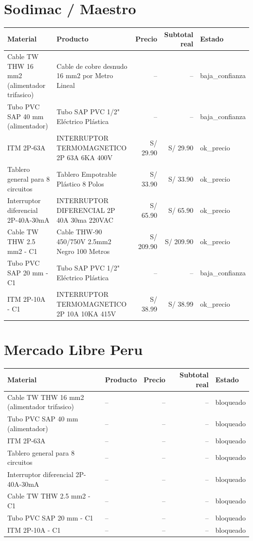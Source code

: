 \documentclass[11pt,a4paper]{article}
\begin{document}
\section{Sodimac / Maestro}
\begin{longtable}{p{} p{} r r p{}}
\toprule Material & Producto & Precio & Subtotal real & Estado \\ \midrule\endhead
Cable TW THW 16 mm2 (alimentador trifasico) & Cable de cobre desnudo 16 mm2 por Metro Lineal & -- & -- & baja\_confianza \\
Tubo PVC SAP 40 mm (alimentador) & Tubo SAP PVC 1/2" Eléctrico Plástica & -- & -- & baja\_confianza \\
ITM 2P-63A & INTERRUPTOR TERMOMAGNETICO 2P 63A 6KA 400V & S/ 29.90 & S/ 29.90 & ok\_precio \\
Tablero general para 8 circuitos & Tablero Empotrable Plástico 8 Polos & S/ 33.90 & S/ 33.90 & ok\_precio \\
Interruptor diferencial 2P-40A-30mA & INTERRUPTOR DIFERENCIAL 2P 40A 30ma 220VAC & S/ 65.90 & S/ 65.90 & ok\_precio \\
Cable TW THW 2.5 mm2 - C1 & Cable THW-90 450/750V 2.5mm2 Negro 100 Metros & S/ 209.90 & S/ 209.90 & ok\_precio \\
Tubo PVC SAP 20 mm - C1 & Tubo SAP PVC 1/2" Eléctrico Plástica & -- & -- & baja\_confianza \\
ITM 2P-10A - C1 & INTERRUPTOR TERMOMAGNETICO 2P 10A 10KA 415V & S/ 38.99 & S/ 38.99 & ok\_precio \\
\bottomrule\end{longtable}

\section{Mercado Libre Peru}
\begin{longtable}{p{} p{} r r p{}}
\toprule Material & Producto & Precio & Subtotal real & Estado \\ \midrule\endhead
Cable TW THW 16 mm2 (alimentador trifasico) & -- & -- & -- & bloqueado \\
Tubo PVC SAP 40 mm (alimentador) & -- & -- & -- & bloqueado \\
ITM 2P-63A & -- & -- & -- & bloqueado \\
Tablero general para 8 circuitos & -- & -- & -- & bloqueado \\
Interruptor diferencial 2P-40A-30mA & -- & -- & -- & bloqueado \\
Cable TW THW 2.5 mm2 - C1 & -- & -- & -- & bloqueado \\
Tubo PVC SAP 20 mm - C1 & -- & -- & -- & bloqueado \\
ITM 2P-10A - C1 & -- & -- & -- & bloqueado \\
\bottomrule\end{longtable}
\end{document}
